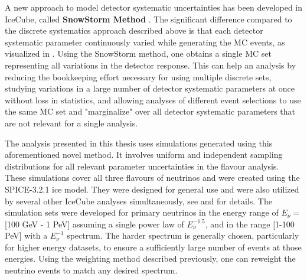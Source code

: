 A new approach to model detector systematic uncertainties has been developed in IceCube, called \textbf{SnowStorm Method} . The significant difference compared to the discrete systematics approach described above is that each detector systematic parameter continuously varied while generating the MC events, as visualized in . Using the SnowStorm method, one obtains a single MC set representing all variations in the detector response. This can help an analysis by reducing the bookkeeping effort necessary for using multiple discrete sets, studying variations in a large number of detector systematic parameters at once without loss in statistics, and allowing analyses of different event selections to use the same MC set and "marginalize" over all detector systematic parameters that are not relevant for a single analysis.

The analysis presented in this thesis uses simulations generated using this aforementioned novel method. It involves uniform and independent sampling distributions for all relevant parameter uncertainties in the flavour analysis. These simulations cover all three flavours of neutrinos and were created using the SPICE-3.2.1 ice model. They were designed for general use and were also utilized by several other IceCube analyses simultaneously, see  and  for details. The simulation sets were developed for primary neutrinos in the energy range of $E_{\nu} = $[100 GeV - 1 PeV] assuming a single power law of $E_{\nu}^{-1.5}$, and in the range [1-100 PeV] with a $E_{\nu}^{-1}$ spectrum. The harder spectrum is generally chosen, particularly for higher energy datasets, to ensure a sufficiently large number of events at those energies. Using the weighting method described previously, one can reweight the neutrino events to match any desired spectrum.


